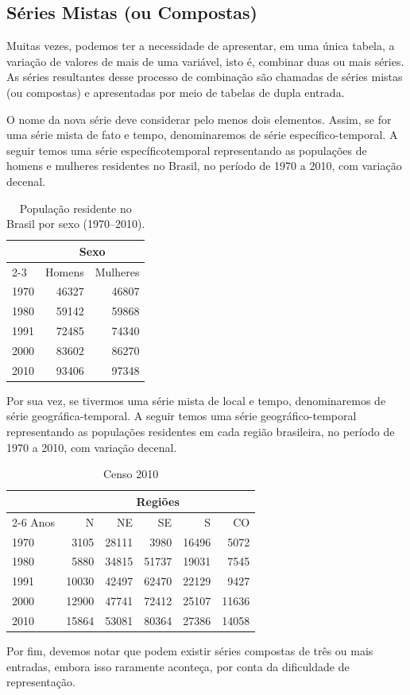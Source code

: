 \subsection{Séries Mistas (ou Compostas)}

Muitas vezes, podemos ter a necessidade de apresentar, em uma única tabela, a variação de valores de mais de uma variável, isto é, combinar duas ou mais séries. As séries resultantes desse processo de combinação são chamadas de séries mistas (ou compostas) e apresentadas por meio de tabelas de dupla entrada.

O nome da nova série deve considerar pelo menos dois elementos. Assim, se for uma série mista de fato e tempo, denominaremos de série específico-temporal. A seguir temos uma série específicotemporal representando as populações de homens e mulheres residentes no Brasil, no período de 1970 a 2010, com variação decenal.

\begin{table}[H]
  \centering
  \caption{População residente no Brasil por sexo (1970--2010).}
  \label{tab:censo_sexo_1970_2010}
  \begin{tabular}{lrr}
    \toprule
      \multicolumn{1}{c}{} & \multicolumn{2}{c}{Sexo} \\
      \cmidrule(lr){2-3}
      \multicolumn{1}{c}{Ano} & \multicolumn{1}{c}{Homens} & \multicolumn{1}{c}{Mulheres} \\
    \midrule
    1970 & 46327 & 46807 \\
    1980 & 59142 & 59868 \\
    1991 & 72485 & 74340 \\
    2000 & 83602 & 86270 \\
    2010 & 93406 & 97348 \\
    \bottomrule
  \end{tabular}
\end{table}

Por sua vez, se tivermos uma série mista de local e tempo, denominaremos de série geográfica-temporal.
A seguir temos uma série geográfico-temporal representando as populações residentes em cada região brasileira, no período de 1970 a 2010, com variação decenal.

\begin{table}[H]
  \centering
  \begin{tabular}{lrrrrr}
    \toprule
      & \multicolumn{5}{c}{Regiões} \\
      \cmidrule(lr){2-6}
    Anos & N & NE & SE & S & CO \\
    \midrule
    1970 & 3105  & 28111 & 3980  & 16496 & 5072 \\
    1980 & 5880  & 34815 & 51737 & 19031 & 7545 \\
    1991 & 10030 & 42497 & 62470 & 22129 & 9427 \\
    2000 & 12900 & 47741 & 72412 & 25107 & 11636 \\
    2010 & 15864 & 53081 & 80364 & 27386 & 14058 \\
    \bottomrule
  \end{tabular}
  \caption{Censo 2010}
\end{table}

Por fim, devemos notar que podem existir séries compostas de três ou mais entradas, embora isso raramente aconteça, por conta da dificuldade de representação.